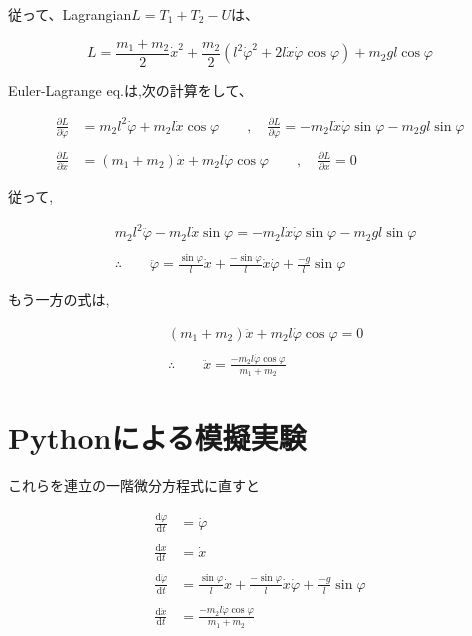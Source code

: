 従って、Lagrangian$L=T_1+T_2-U$は、

\[L=\displaystyle\frac{m_1+m_2}{2}\dot{x}^2+\frac{m_2}{2}\left(l^2\dot{\varphi}^2+2l\dot{x}\dot{\varphi}\cos\varphi\right)+m_2gl\cos\varphi\]

Euler-Lagrange eq.は,次の計算をして、

\begin{align*}
   \frac{\partial L}{\partial\dot{\varphi}}&=m_2l^2\dot{\varphi} + m_2l\dot{x}\cos\varphi \qquad,\quad \frac{\partial L}{\partial \varphi} = -m_2l\dot{x}\dot{\varphi}\sin\varphi - m_2gl\sin\varphi\\\\
   \frac{\partial L}{\partial \dot{x}} &= (m_1+m_2)\dot{x} + m_2l\dot{\varphi}\cos\varphi \qquad,\quad \frac{\partial L}{\partial x}=0
\end{align*}

従って,

\begin{align*}
   &m_2l^2\ddot{\varphi}-m_2l\dot{x}\sin\varphi = -m_2l\dot{x}\dot{\varphi}\sin\varphi - m_2gl\sin\varphi\\\\
   &\therefore \qquad \ddot{\varphi} = \frac{\sin\varphi}{l}\dot{x}+\frac{-\sin\varphi}{l}\dot{x}\dot{\varphi}+\frac{-g}{l}\sin\varphi
\end{align*}

もう一方の式は,

\begin{align*}
   &(m_1+m_2)\ddot{x}+m_2l\dot{\varphi}\cos\varphi=0\\\\
   &\therefore \qquad \ddot{x}=\displaystyle\frac{-m_2l\dot{\varphi}\cos\varphi}{m_1+m_2}
\end{align*}

\section{Pythonによる模擬実験}

これらを連立の一階微分方程式に直すと

\begin{align*}
   \displaystyle\frac{\mathrm{d}\varphi}{\mathrm{d}t}&=\dot{\varphi}\\\\
   \displaystyle\frac{\mathrm{d}x}{\mathrm{d}t}&=\dot{x}\\\\
   \displaystyle\frac{\mathrm{d}\dot{\varphi}}{\mathrm{d}t}&=\displaystyle\frac{\sin\varphi}{l}\dot{x}+\frac{-\sin\varphi}{l}\dot{x}\dot{\varphi}+\frac{-g}{l}\sin\varphi\\\\
   \displaystyle\frac{\mathrm{d}\dot{x}}{\mathrm{d}t}&=\displaystyle\frac{-m_2l\dot{\varphi}\cos\varphi}{m_1+m_2}
\end{align*}

